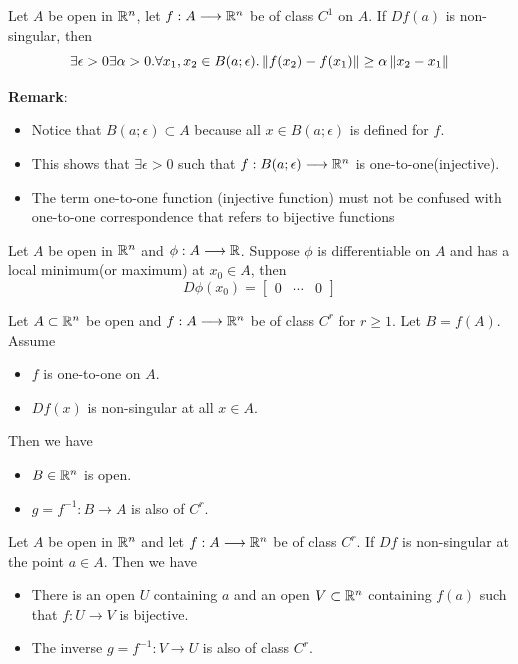 \begin{lemma}\label{TIFlemma2}
    Let $A$ be open in $\mathbb{R}^n$, let $f:A\longrightarrow\mathbb{R}^n$ be of class $C^1$ on $A$. 
    If $Df(a)$ is non-singular, then 
    $$\exists \epsilon>0\exists \alpha>0. \forall x_1,x_2\in B(a;\epsilon). \left\lVert f(x_2)-f(x_1) \right\rVert\geq \alpha \left\lVert x_2-x_1 \right\rVert$$
\end{lemma}
\noindent \textbf{Remark}:
\begin{itemize}
    \item Notice that $B(a;\epsilon)\subset A$ because all $x \in B(a;\epsilon)$ is defined for $f$.
    \item This shows that $\exists \epsilon>0$ such that $f:B(a;\epsilon)\longrightarrow\mathbb{R}^n$ is one-to-one(injective).
    \item The term one-to-one function (injective function) must not be confused with one-to-one correspondence that refers to bijective functions
\end{itemize}

\begin{lemma}\label{extremum 0matrix}
    Let $A$ be open in $\mathbb{R}^n$ and $\phi:A\longrightarrow\mathbb{R}$. Suppose $\phi$ is differentiable on $A$ and has a local minimum(or maximum) at $x_0\in A$, then $$D\phi(x_0)=\begin{bmatrix}
        0 & \cdots & 0
    \end{bmatrix}$$
\end{lemma}


\begin{theorem}\label{TIFintermediathm}
    Let $A\subset \mathbb{R}^n$ be open and $f:A\longrightarrow \mathbb{R}^n$ be of class $C^r$ for $r \geq 1$. Let $B=f(A)$. Assume
    \begin{itemize}
        \item $f$ is one-to-one on $A$.
        \item $Df(x)$ is non-singular at all $x\in A$.
    \end{itemize}
    Then we have
    \begin{itemize}
        \item $B\in \mathbb{R}^n$ is open.
        \item $g=f^{-1}:B\longrightarrow A$ is also of $C^r$.
    \end{itemize}
\end{theorem}

\begin{theorem}
    Let $A$ be open in $\mathbb{R}^n$ and let $f:A\longrightarrow \mathbb{R}^n$ be of class $C^r$. 
    If $Df$ is non-singular at the point $a\in A$.
    Then we have
    \begin{itemize}
        \item There is an open $U$ containing $a$ and an open $V\subset\mathbb{R}^n$ containing $f(a)$ such that $f:U\longrightarrow V$ is bijective.
        \item The inverse $g=f^{-1}:V \longrightarrow U$ is also of class $C^r$.
    \end{itemize}
\end{theorem}

